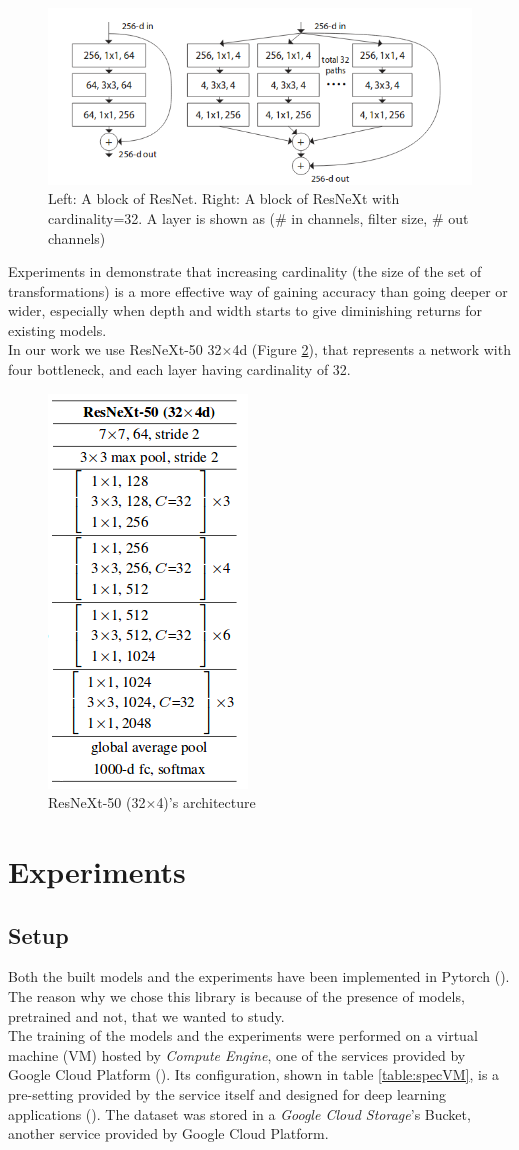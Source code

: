 \documentclass{article}
\begin{document}
\begin{figure}[h]
	\centering
	\includegraphics[width=0.7\linewidth]{image/resnext}
	\caption{Left: A block of ResNet. Right: A block of ResNeXt with cardinality=32. A layer is shown as (\# in channels, filter size, \# out channels)}
	\label{fig:resnext_block}
\end{figure}

Experiments in \cite{resnext} demonstrate that increasing cardinality (the size of the set of transformations) is a more effective way of gaining accuracy than going deeper or wider, especially when depth and width starts to give diminishing returns for existing models.\\
In our work we use ResNeXt-50 32$\times$4d (Figure \ref{fig:res}), that represents a network with four bottleneck, and each layer having cardinality of 32. 

\begin{figure}
	\centering
	\includegraphics[height=0.4\linewidth]{image/res}
	\caption{ResNeXt-50 (32$\times$4)'s architecture}
	\label{fig:res}
\end{figure}
\section{Experiments}\label{experiments}

\subsection{Setup}
Both the built models and the experiments have been implemented in Pytorch (\cite{pytorch}). The reason why we chose this library is because of the presence of models, pretrained and not, that we wanted to study.\\
The training of the models and the experiments were performed on a virtual machine (VM) hosted by \textit{Compute Engine}, one of the services provided by Google Cloud Platform (\cite{gcloud}). Its configuration, shown in table \ref{table:specVM}, is a pre-setting provided by the service itself and designed for deep learning applications  (\cite{vmconfig}). The dataset was stored in a \textit{Google Cloud Storage}'s Bucket, another service provided by Google Cloud Platform.
\end{document}
